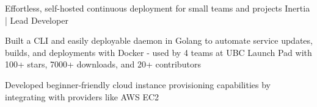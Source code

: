  {\scshape{}}
\begin{cventries}

  \cventry
    {Effortless, self-hosted continuous deployment for small teams and projects} %
    {Inertia | Lead Developer} %
    {} %
    {} %
    {
      \begin{cvitems} %
        \item {Built a CLI and easily deployable daemon in Golang to automate service updates, builds, and deployments with Docker - used by 4 teams at UBC Launch Pad with 100+ stars, 7000+ downloads, and 20+ contributors}
        \item {Developed beginner-friendly cloud instance provisioning capabilities by integrating with providers like AWS EC2}
      \end{cvitems}
    }

\iffalse
  \cventry
    {Game scouting and performance analytics for League of Legends teams} %
    {Seer | Personal Project} %
    {\linktext{bobheadxi.dev/r/seer}} %
    {} %
    {
      \begin{cvitems} %
        \item {leveraged Google BigQuery as a data warehouse for team match history and queries for trends and aggregations}
        \item {built graph visualizations in Vue.js, Vuex, and ChartJS for displaying team trends and performance insights}
        \item {implemented a job-based framework for managing data to handle rate limits of dependencies and for error resilience}
      \end{cvitems}
    }
\fi
\iffalse
  \cventry
    {Continuous benchmarking and benchmark visualization} %
    {Gobenchdata | Personal Project} %
    {\linktext{bobheadxi.dev/r/gobenchdata}} %
    {} %
    {
      \begin{cvitems} %
        \item {built a command-line tool and GitHub action for automatically running Go benchmarks and parsing output into JSON}
        \item {created a web application that can visualize JSON data stored in GitHub pages to chart performance improvements}
      \end{cvitems}
    }
\fi


\end{cventries}
